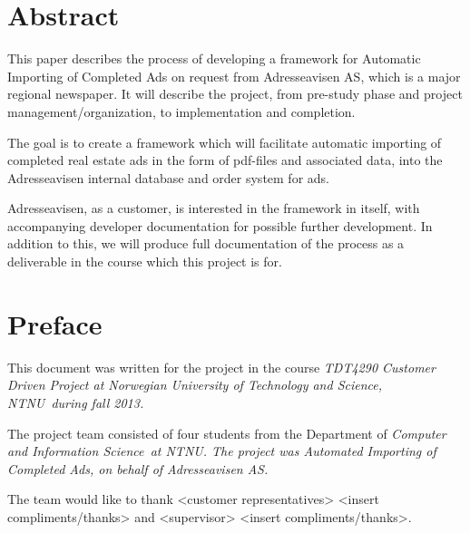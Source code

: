 \documentclass[12pt, a4paper]{article}
\begin{document}
\section{Abstract}

This paper describes the process of developing a framework for Automatic Importing of Completed Ads on request from Adresseavisen AS, which is a major regional newspaper. It will describe the project, from pre-study phase and project management/organization, to implementation and completion.

The goal is to create a framework which will facilitate automatic importing of completed real estate ads in the form of pdf-files and associated data, into the Adresseavisen internal database and order system for ads.

Adresseavisen, as a customer, is interested in the framework in itself, with accompanying developer documentation for possible further development. In addition to this, we will produce full documentation of the process as a deliverable in the course which this project is for.

\newpage

\section{Preface}
This document was written for the project in the course \em TDT4290 Customer Driven Project at Norwegian University of Technology and Science, NTNU\em \ during fall 2013.

The project team consisted of four students from the Department of \em Computer and Information Science\em \ at \em NTNU\em. The project was \em Automated Importing of Completed Ads\em, on behalf of \em Adresseavisen AS\em.

The team would like to thank <customer representatives> <insert compliments/thanks> and <supervisor> <insert compliments/thanks>.
\end{document}
